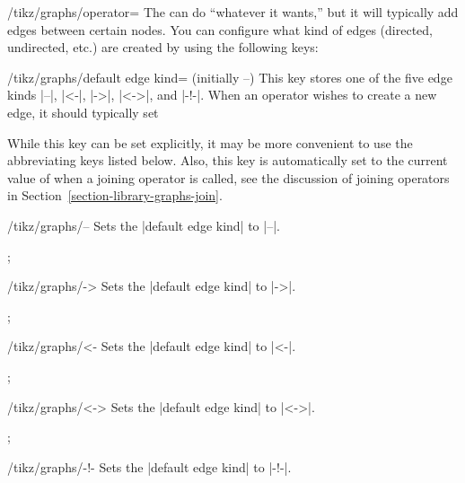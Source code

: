 \begin{key}{/tikz/graphs/operator=}
  The  can do ``whatever it wants,'' but it will typically
  add edges between certain nodes. You can configure what kind of
  edges (directed, undirected, etc.) are created by using the
  following keys:
  \begin{key}{/tikz/graphs/default edge kind= (initially --)}
    This key stores one of the five edge kinds |--|, |<-|, |->|,
    |<->|, and |-!-|. When an operator wishes to create a new edge, it
    should typically set
\begin{codeexample}
\end{codeexample}
    While this key can be set explicitly, it may be more convenient to
    use the abbreviating keys listed below. Also, this key is
    automatically set to the current value of  when a joining operator is called, see the
    discussion of joining operators in
    Section~\ref{section-library-graphs-join}.
  \end{key}
  \begin{key}{/tikz/graphs/--}
    Sets the |default edge kind| to |--|.
\begin{codeexample}[]
\tikz {};      
\end{codeexample}
  \end{key}
  \begin{key}{/tikz/graphs/->}
    Sets the |default edge kind| to |->|.
\begin{codeexample}[]
\tikz {};      
\end{codeexample}
  \end{key}
  \begin{key}{/tikz/graphs/<-}
    Sets the |default edge kind| to |<-|.
\begin{codeexample}[]
\tikz {};      
\end{codeexample}
  \end{key}
  \begin{key}{/tikz/graphs/<->}
    Sets the |default edge kind| to |<->|.
\begin{codeexample}[]
\tikz {};      
\end{codeexample}
  \end{key}
  \begin{key}{/tikz/graphs/-!-}
    Sets the |default edge kind| to |-!-|.
  \end{key}
  

\end{key}
